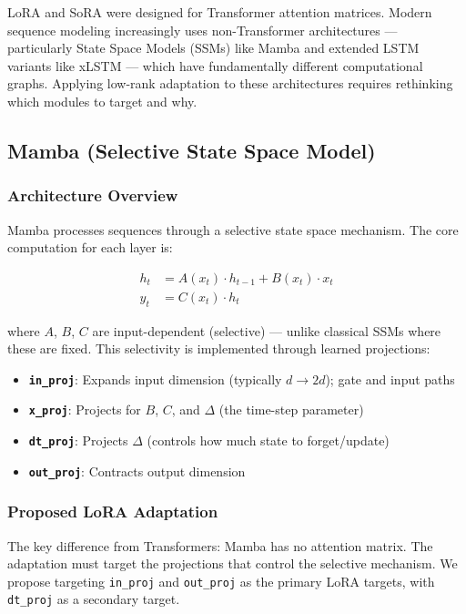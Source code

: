 \documentclass[12pt,a4paper]{article}
\theoremstyle{definition}
\begin{document}
LoRA and SoRA were designed for Transformer attention matrices. Modern sequence modeling increasingly uses non-Transformer architectures — particularly State Space Models (SSMs) like Mamba and extended LSTM variants like xLSTM — which have fundamentally different computational graphs. Applying low-rank adaptation to these architectures requires rethinking which modules to target and why.

\subsection{Mamba (Selective State Space Model)}

\subsubsection{Architecture Overview}

Mamba \cite{gu2023mamba} processes sequences through a selective state space mechanism. The core computation for each layer is:

\begin{align}
h_t &= A(x_t) \cdot h_{t-1} + B(x_t) \cdot x_t \\
y_t &= C(x_t) \cdot h_t
\end{align}

where $A$, $B$, $C$ are input-dependent (selective) — unlike classical SSMs where these are fixed. This selectivity is implemented through learned projections:

\begin{itemize}
    \item \textbf{\texttt{in\_proj}}: Expands input dimension (typically $d \to 2d$); gate and input paths
    \item \textbf{\texttt{x\_proj}}: Projects for $B$, $C$, and $\Delta$ (the time-step parameter)
    \item \textbf{\texttt{dt\_proj}}: Projects $\Delta$ (controls how much state to forget/update)
    \item \textbf{\texttt{out\_proj}}: Contracts output dimension
\end{itemize}

\subsubsection{Proposed LoRA Adaptation}

The key difference from Transformers: Mamba has no attention matrix. The adaptation must target the projections that control the selective mechanism. We propose targeting \texttt{in\_proj} and \texttt{out\_proj} as the primary LoRA targets, with \texttt{dt\_proj} as a secondary target.
\end{document}
